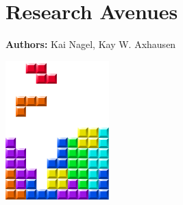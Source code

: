 \chapter{Research Avenues }
\label{ch:researchavenues}

\hfill \textbf{Authors:} Kai Nagel, Kay W. Axhausen

\begin{center} \includegraphics[width=0.3\textwidth, angle=0]{figures/MATSimBook.png} \end{center}

